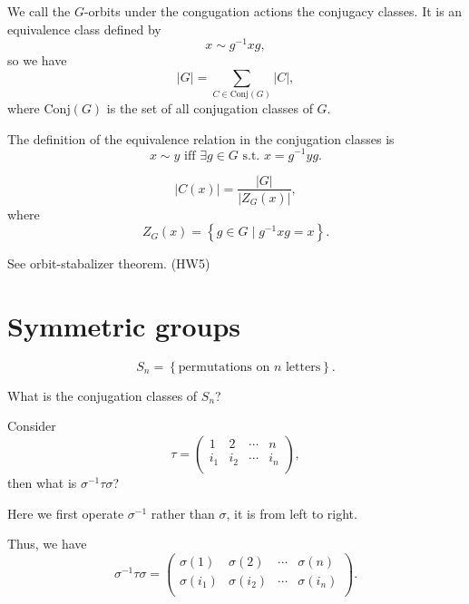 \begin{definition}
    We call the \(G\)-orbits under the congugation actions the conjugacy classes. It is an equivalence class defined by 
    \[
        x \sim g^{-1} x g, 
    \] so we have 
    \[
        \vert G \vert = \sum_{C \in \mathrm{Conj}(G) }  \vert C \vert ,  
    \]where \(\mathrm{Conj}(G) \) is the set of all conjugation classes of \(G\).  
\end{definition}
\begin{note}
    The definition of the equivalence relation in the conjugation classes is 
    \[
        x \sim y \text{ iff } \exists g \in G \text{ s.t. } x = g^{-1} y g.
    \]
\end{note}
\begin{proposition}
    \[
        \vert C(x) \vert = \frac{\vert G \vert}{\left\vert Z_G(x) \right\vert }, 
    \] where 
    \[
        Z_G(x) = \left\{ g \in G \mid g^{-1} x g = x \right\}. 
    \]
\end{proposition}
\begin{remark}
    See orbit-stabalizer theorem. (HW5)
\end{remark}

\section{Symmetric groups}
\begin{definition}
    \[
        S_n = \left\{ \text{permutations on } n\text{ letters}  \right\}. 
    \]
\end{definition}

\begin{question}
    What is the conjugation classes of \(S_n\)? 
\end{question}

Consider 
\[
    \tau = \begin{pmatrix}
        1 & 2 & \cdots & n  \\
        i_1 & i_2 & \cdots & i_n  \\
    \end{pmatrix},
\]
then what is \(\sigma ^{-1} \tau \sigma \)?

\begin{note}
    Here we first operate \(\sigma ^{-1}\) rather than \(\sigma \), it is from left to right. 
\end{note}

Thus, we have 
\[
    \sigma ^{-1} \tau \sigma = \begin{pmatrix}
        \sigma (1) & \sigma (2) & \cdots & \sigma (n)  \\
        \sigma (i_1) & \sigma (i_2) & \cdots & \sigma (i_n)  \\
    \end{pmatrix}.
\]

